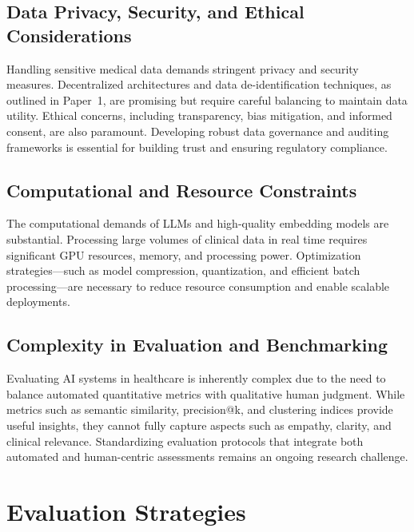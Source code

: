 \subsection{Data Privacy, Security, and Ethical Considerations}
Handling sensitive medical data demands stringent privacy and security measures. Decentralized architectures and data de-identification techniques, as outlined in Paper~1, are promising but require careful balancing to maintain data utility. Ethical concerns, including transparency, bias mitigation, and informed consent, are also paramount. Developing robust data governance and auditing frameworks is essential for building trust and ensuring regulatory compliance.

\subsection{Computational and Resource Constraints}
The computational demands of LLMs and high-quality embedding models are substantial. Processing large volumes of clinical data in real time requires significant GPU resources, memory, and processing power. Optimization strategies—such as model compression, quantization, and efficient batch processing—are necessary to reduce resource consumption and enable scalable deployments.

\subsection{Complexity in Evaluation and Benchmarking}
Evaluating AI systems in healthcare is inherently complex due to the need to balance automated quantitative metrics with qualitative human judgment. While metrics such as semantic similarity, precision@k, and clustering indices provide useful insights, they cannot fully capture aspects such as empathy, clarity, and clinical relevance. Standardizing evaluation protocols that integrate both automated and human-centric assessments remains an ongoing research challenge.

\section{Evaluation Strategies}

